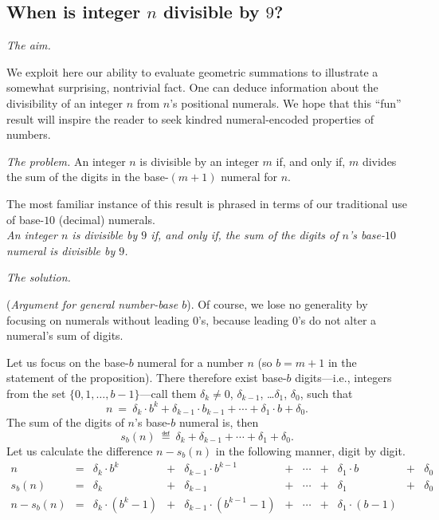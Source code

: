\subsection{When is integer $n$ divisible by $9$?}
\label{sec:divisible-by-9}

\noindent \textit{The aim.}

We exploit here our ability to evaluate geometric summations to
illustrate a somewhat surprising, nontrivial fact.  One can deduce
information about the divisibility of an integer $n$ from $n$'s
positional numerals.  We hope that this ``fun'' result will inspire
the reader to seek kindred numeral-encoded properties of numbers.

\medskip
\noindent \textit{The problem.}
An integer $n$ is divisible by an integer $m$ if, and only if, $m$
divides the sum of the digits in the base-$(m+1)$ numeral for $n$.
\medskip

The most familiar instance of this result is phrased in terms of our
traditional use of base-$10$ (decimal) numerals. \\
{\it An integer $n$ is divisible by $9$ if, and only if, the sum of
  the digits of $n$'s base-$10$ numeral is divisible by $9$.}
\medskip

\noindent \textit{The solution.}

({\it Argument for general number-base $b$}).
%
Of course, we lose no generality by focusing on numerals without
leading $0$'s, because leading $0$'s do not alter a numeral's sum of
digits.

Let us focus on the base-$b$ numeral for a number $n$ (so $b = m+1$ in
the statement of the proposition).  There therefore exist base-$b$
digits---i.e., integers from the set $\{0, 1, \ldots, b-1\}$---call
them $\delta_k \neq 0$, $\delta_{k-1}$, \ldots $\delta_1$, $\delta_0$,
such that
\[ n \ = \ \delta_k \cdot b^k + \delta_{k-1} \cdot b_{k-1} + \cdots +
\delta_1 \cdot b + \delta_0. \]
The sum of the digits of $n$'s base-$b$ numeral is, then
\[ s_b(n) \ \eqdef \ \delta_k + \delta_{k-1} + \cdots + \delta_1 +
\delta_0. \]
Let us calculate the difference $n - s_b(n)$ in the following manner,
digit by digit.
\begin{equation}
\label{eq:sum-of-digits}
\begin{array}{ccccccccccc}
n & = &
\delta_k \cdot b^k & + & \delta_{k-1} \cdot b^{k-1} & + & \cdots
  & + & \delta_1 \cdot b & + & \delta_0 \\
s_b(n) & = &
\delta_k & + & \delta_{k-1} & + & \cdots & + & \delta_1 & + & \delta_0 \\
\hline
n - s_b(n) & = &
\delta_k \cdot (b^k -1) & + &
\delta_{k-1} \cdot (b^{k-1} -1) & + &
\cdots & + &
\delta_1 \cdot (b-1) & & 
\end{array}
\end{equation}

